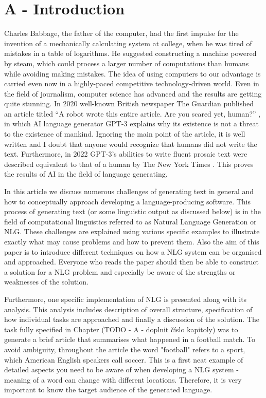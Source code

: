 \chapter*{A - Introduction}

Charles Babbage, the father of the computer, had the first impulse for the invention of a mechanically calculating system at college, when he was tired of mistakes in a table of logarithms. He suggested constructing a machine powered by steam, which could process a larger number of computations than humans while avoiding making mistakes. The idea of using computers to our advantage is carried even now in a highly-paced competitive technology-driven world. Even in the field of journalism, computer science has advanced and the results are getting quite stunning. In 2020  well-known British newspaper The Guardian published an article titled “A robot wrote this entire article. Are you scared yet, human?” \cite{gpt32020robot}, in which AI language generator GPT-3 explains why its existence is not a threat to the existence of mankind. Ignoring the main point of the article, it is well written and I doubt that anyone would recognize that humans did not write the text. Furthermore, in 2022 GPT-3's abilities to write fluent prosaic text were described equivalent to that of a human by The New York Times \cite{johnson2022ai}. This proves the results of AI in the field of language generating.

In this article we discuss numerous challenges of generating text in general and how to conceptually approach developing a language-producing software. This process of generating text (or some linguistic output as discussed below) is in the field of computational linguistics referred to as Natural Language Generation or NLG. These challenges are explained using various specific examples to illustrate exactly what may cause problems and how to prevent them. Also the aim of this paper is to introduce different techniques on how a NLG system can be organised and approached. Everyone who reads the paper should then be able to construct a solution for a NLG problem and especially be aware of the strengths or weaknesses of the solution.

Furthermore, one specific implementation of NLG is presented along with its analysis. This analysis includes description of overall structure, specification of how individual tasks are approached and finally a discussion of the solution. The task fully specified in Chapter (TODO - A - doplnit číslo kapitoly) was to generate a brief article that summarises what happened in a football match. To avoid ambiguity, throughout the article the word "football" refers to a sport, which American English speakers call soccer. This is a first neat example of detailed aspects you need to be aware of when developing a NLG system - meaning of a word can change with different locations. Therefore, it is very important to know the target audience of the generated language. 



